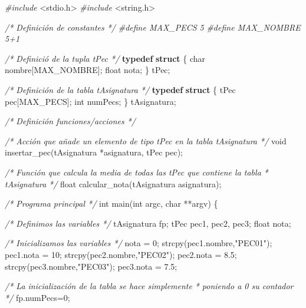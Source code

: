 \documentclass[
]{book}
\newenvironment{Shaded}{\begin{snugshade}}{\end{snugshade}}
\newcommand{\CommentTok}[1]{\textcolor[rgb]{0.56,0.35,0.01}{\textit{#1}}}
\newcommand{\DataTypeTok}[1]{\textcolor[rgb]{0.13,0.29,0.53}{#1}}
\newcommand{\DecValTok}[1]{\textcolor[rgb]{0.00,0.00,0.81}{#1}}
\newcommand{\FloatTok}[1]{\textcolor[rgb]{0.00,0.00,0.81}{#1}}
\newcommand{\ImportTok}[1]{#1}
\newcommand{\KeywordTok}[1]{\textcolor[rgb]{0.13,0.29,0.53}{\textbf{#1}}}
\newcommand{\NormalTok}[1]{#1}
\newcommand{\PreprocessorTok}[1]{\textcolor[rgb]{0.56,0.35,0.01}{\textit{#1}}}
\newcommand{\StringTok}[1]{\textcolor[rgb]{0.31,0.60,0.02}{#1}}
\begin{document}
\begin{Shaded}
\begin{Highlighting}[]
\PreprocessorTok{\#include }\ImportTok{\textless{}stdio.h\textgreater{}}
\PreprocessorTok{\#include }\ImportTok{\textless{}string.h\textgreater{}}

\CommentTok{/* Definición de constantes */}
\PreprocessorTok{\#define MAX\_PECS 5}
\PreprocessorTok{\#define MAX\_NOMBRE 5+1}

\CommentTok{/* Definició de la tupla tPec */}
\KeywordTok{typedef} \KeywordTok{struct}\NormalTok{ \{}
    \DataTypeTok{char}\NormalTok{ nombre[MAX\_NOMBRE];}
    \DataTypeTok{float}\NormalTok{ nota;}
\NormalTok{\} tPec;}

\CommentTok{/* Definición de la tabla tAsignatura */}
\KeywordTok{typedef} \KeywordTok{struct}\NormalTok{ \{}
\NormalTok{    tPec pec[MAX\_PECS];}
    \DataTypeTok{int}\NormalTok{ numPecs;}
\NormalTok{\} tAsignatura;}

\CommentTok{/* Definición funciones/acciones */}

\CommentTok{/* Acción que añade un elemento de tipo tPec en la tabla tAsignatura */}
\DataTypeTok{void}\NormalTok{ insertar\_pec(tAsignatura *asignatura, tPec pec);}

\CommentTok{/* Función que calcula la media de todas las tPec que contiene la tabla}
\CommentTok{ * tAsignatura }
\CommentTok{ */}
\DataTypeTok{float}\NormalTok{ calcular\_nota(tAsignatura asignatura);}

\CommentTok{/* Programa principal */}
\DataTypeTok{int}\NormalTok{ main(}\DataTypeTok{int}\NormalTok{ argc, }\DataTypeTok{char}\NormalTok{ **argv) \{}

    \CommentTok{/* Definimos las variables */}
\NormalTok{    tAsignatura fp;}
\NormalTok{    tPec pec1, pec2, pec3;}
    \DataTypeTok{float}\NormalTok{ nota;}

    \CommentTok{/* Inicializamos las variables */}
\NormalTok{    nota = }\DecValTok{0}\NormalTok{;}
\NormalTok{    strcpy(pec1.nombre,}\StringTok{"PEC01"}\NormalTok{);}
\NormalTok{    pec1.nota = }\DecValTok{10}\NormalTok{;}
\NormalTok{    strcpy(pec2.nombre,}\StringTok{"PEC02"}\NormalTok{);}
\NormalTok{    pec2.nota = }\FloatTok{8.5}\NormalTok{;}
\NormalTok{    strcpy(pec3.nombre,}\StringTok{"PEC03"}\NormalTok{);}
\NormalTok{    pec3.nota = }\FloatTok{7.5}\NormalTok{;}

    \CommentTok{/* La inicialización de la tabla se hace simplemente}
\CommentTok{     * poniendo a 0 su contador}
\CommentTok{     */}
\NormalTok{    fp.numPecs=}\DecValTok{0}\NormalTok{;}


\end{Highlighting}
\end{Shaded}
\end{document}
